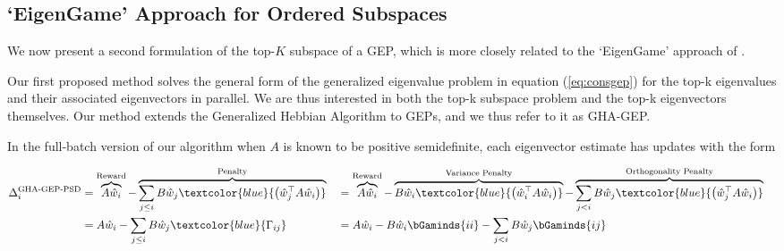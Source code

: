 \subsection{`EigenGame' Approach for Ordered Subspaces}\label{sec:gep-eg-formulation}

We now present a second formulation of the top-$K$ subspace of a GEP, which is more closely related to the `EigenGame' approach of \cite{gemp20,gemp2021}.

Our first proposed method solves the general form of the generalized eigenvalue problem in equation (\ref{eq:consgep}) for the top-k eigenvalues and their associated eigenvectors in parallel. We are thus interested in both the top-k subspace problem and the top-k eigenvectors themselves. Our method extends the Generalized Hebbian Algorithm to GEPs, and we thus refer to it as GHA-GEP.

In the full-batch version of our algorithm when $A$ is known to be positive semidefinite, each eigenvector estimate has updates with the form

\begin{align}
    \Delta_{i}^{\text{GHA-GEP-PSD}}
    &=
    \overbrace{A \hat{w}_{i}}^{\text{Reward}} - \overbrace{\sum_{j \leq i}B\hat{w}_{j}\textcolor{blue}{\left(\hat{w}_{j}^{\top} A \hat{w}_{i}\right)}}^{\text{Penalty}}
    &&=
    \overbrace{A \hat{w}_{i}}^{\text{Reward}} - \overbrace{B\hat{w}_{i}\textcolor{blue}{\left(\hat{w}_{i}^{\top} A \hat{w}_{i}\right)}}^{\text{Variance Penalty}} - \overbrace{\sum_{j < i}B\hat{w}_{j}\textcolor{blue}{\left(\hat{w}_{j}^{\top} A \hat{w}_{i}\right)}}^{\text{Orthogonality Penalty}} & \nonumber\\
    &=A \hat{w}_{i} - \sum_{j \leq i}B\hat{w}_{j}\textcolor{blue}{\Gamma_{ij}}
    &&=
    A \hat{w}_{i} - B\hat{w}_{i}\bGaminds{ii} - \sum_{j < i}B\hat{w}_{j}\bGaminds{ij}&
    \label{eq:psdupdate}
\end{align}

